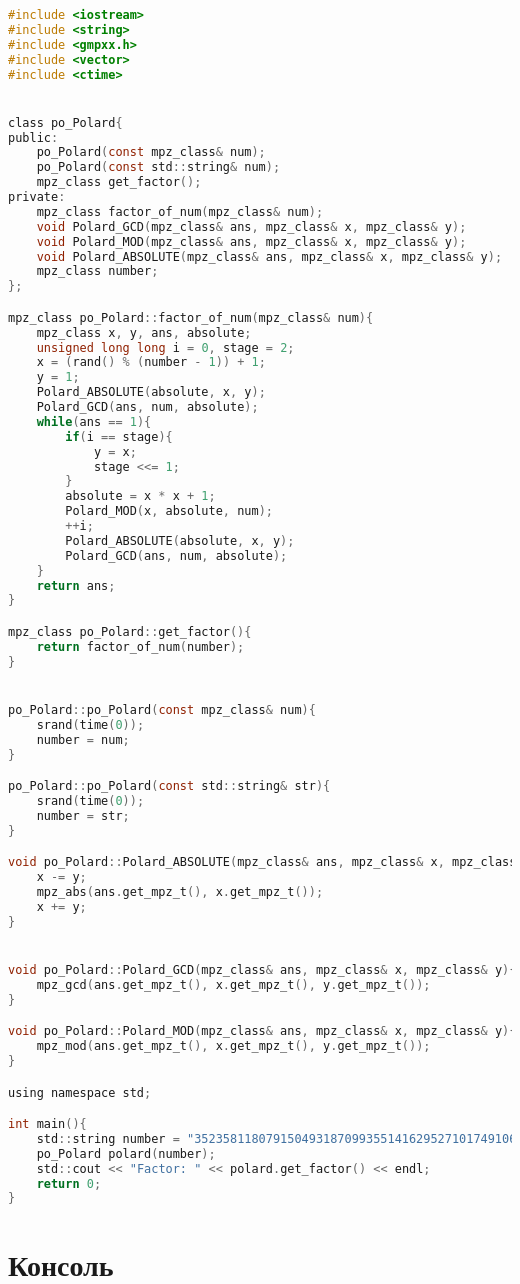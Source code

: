 \documentclass[pdf, unicode, 12pt, a4paper,oneside,fleqn]{article}
\begin{document}
\begin{lstlisting}[language=C]
#include <iostream>
#include <string>
#include <gmpxx.h>
#include <vector>
#include <ctime>


class po_Polard{
public:
    po_Polard(const mpz_class& num);
    po_Polard(const std::string& num);
    mpz_class get_factor();
private:
    mpz_class factor_of_num(mpz_class& num);
    void Polard_GCD(mpz_class& ans, mpz_class& x, mpz_class& y);
    void Polard_MOD(mpz_class& ans, mpz_class& x, mpz_class& y);
    void Polard_ABSOLUTE(mpz_class& ans, mpz_class& x, mpz_class& y);
    mpz_class number;
};

mpz_class po_Polard::factor_of_num(mpz_class& num){
    mpz_class x, y, ans, absolute;
    unsigned long long i = 0, stage = 2;
    x = (rand() % (number - 1)) + 1;
    y = 1;
    Polard_ABSOLUTE(absolute, x, y);
    Polard_GCD(ans, num, absolute);
    while(ans == 1){
        if(i == stage){
            y = x;
            stage <<= 1;
        }
        absolute = x * x + 1;
        Polard_MOD(x, absolute, num);
        ++i;
        Polard_ABSOLUTE(absolute, x, y);
        Polard_GCD(ans, num, absolute);
    }
    return ans;
}

mpz_class po_Polard::get_factor(){
    return factor_of_num(number);
}


po_Polard::po_Polard(const mpz_class& num){
    srand(time(0));
    number = num;
}

po_Polard::po_Polard(const std::string& str){
    srand(time(0));
    number = str;
}

void po_Polard::Polard_ABSOLUTE(mpz_class& ans, mpz_class& x, mpz_class& y){
    x -= y;
    mpz_abs(ans.get_mpz_t(), x.get_mpz_t());
    x += y;
}


void po_Polard::Polard_GCD(mpz_class& ans, mpz_class& x, mpz_class& y){
    mpz_gcd(ans.get_mpz_t(), x.get_mpz_t(), y.get_mpz_t());
}

void po_Polard::Polard_MOD(mpz_class& ans, mpz_class& x, mpz_class& y){
    mpz_mod(ans.get_mpz_t(), x.get_mpz_t(), y.get_mpz_t());
}

using namespace std;

int main(){
    std::string number = "352358118079150493187099355141629527101749106167997255509619020528333722352217";
    po_Polard polard(number);
    std::cout << "Factor: " << polard.get_factor() << endl;
    return 0;
}
\end{lstlisting}

\pagebreak

\section{Консоль}
\end{document}
